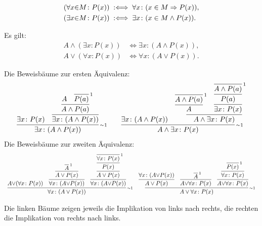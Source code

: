 \begin{Definition}%
\label{def:bounded}
\begin{align*}
(\forall x{\in}M\colon P(x)) &\;:\Longleftrightarrow\; \forall x\colon (x\in M\Rightarrow P(x)),\\
(\exists x{\in}M\colon P(x)) &\;:\Longleftrightarrow\; \exists x\colon (x\in M\land P(x)).
\end{align*}
\end{Definition}

\begin{Satz}%
\label{general-dl}
Es gilt:
\begin{align*}
A\land (\exists x\colon P(x)) &\iff \exists x\colon (A\land P(x)),\\
A\lor (\forall x\colon P(x)) &\iff \forall x\colon (A\lor P(x)).
\end{align*}
\end{Satz}
\begin{Beweis}[Beweis]
Die Beweisbäume zur ersten Äquivalenz:
\[\begin{array}{c@{\qquad}c}
\infer[\infernote{$\sim$1}]{\exists x\colon (A\land P(x))}{
  \exists x\colon P(x)
& \infer{\exists x\colon (A\land P(x))}{
    \infer{A\land P(a)}{A & \infer[\infernote{1}]{P(a)}{}}}}
&
\infer[\infernote{$\sim$1}]{A\land\exists x\colon P(x)}{
  \exists x\colon (A\land P(x))
& \infer{A\land \exists x\colon P(x)}{
    \infer{A}{\infer[\infernote{1}]{A\land P(a)}{}}
  & \infer{\exists x\colon P(x)}{
      \infer{P(a)}{\infer[\infernote{1}]{A\land P(a)}{}}}}}
\end{array}\]
Die Beweisbäume zur zweiten Äquivalenz:
{\small
\[\begin{array}{c@{\quad}c}
\infer[\infernote{$\sim$1}]{\forall x\colon (A\lor P(x))}{
A{\lor}(\forall x\colon P(x))
& \infer{\forall x\colon (A{\lor}P(x))}{
    \infer{A\lor P(x)}{\infer[\infernote{1}]{A}{}}
  }
& \infer{\forall x\colon (A{\lor}P(x))}{
    \infer{A\lor P(x)}{
      \infer{P(x)}{\infer[\infernote{1}]{\forall x\colon P(x)}{}}}}}
&
\infer[\infernote{$\sim$1}]{A\lor\forall x\colon P(x)}{
  \infer{A\lor P(x)}{\forall x\colon (A{\lor}P(x))}
  & \infer{A{\lor}\forall x\colon P(x)}{
      \infer[\infernote{1}]{A}{}}
  & \infer{A{\lor}\forall x\colon P(x)}{
      \infer{\forall x\colon P(x)}{
        \infer[\infernote{1}]{P(x)}{}}}}
\end{array}\]
}

\noindent
Die linken Bäume zeigen jeweils die Implikation von links nach
rechts, die rechten die Implikation von rechts nach
links.\,\qedsymbol
\end{Beweis}

